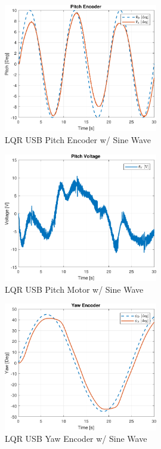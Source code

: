 \documentclass[fontsize=11pt, %
                             paper=letter, %
                             openany, %
                             captions=tableheading,
                             index=totoc,
                             hyperref]{labbook}
\begin{document}
\begin{addmargin}[0cm]{0cm}
\begin{figure}[H]
  \centering
  \includegraphics[width=0.6\textwidth]{figs/matlab/LQR_USB/Pitch_Pos_LQR_USB_SIN}
  \caption{LQR USB Pitch Encoder w/ Sine Wave}
  \label{fig:Pitch_Pos_LQR_USB_SIN}
\end{figure}

\begin{figure}[H]
  \centering
  \includegraphics[width=0.6\textwidth]{figs/matlab/LQR_USB/Pitch_Volt_LQR_USB_SIN}
  \caption{LQR USB Pitch Motor w/ Sine Wave}
  \label{fig:Pitch_Volt_LQR_USB_SIN}
\end{figure}

\begin{figure}[H]
  \centering
  \includegraphics[width=0.6\textwidth]{figs/matlab/LQR_USB/Yaw_Pos_LQR_USB_SIN}
  \caption{LQR USB Yaw Encoder w/ Sine Wave}
  \label{fig:Yaw_Pos_LQR_USB_SIN}
\end{figure}


\end{addmargin}
\end{document}
